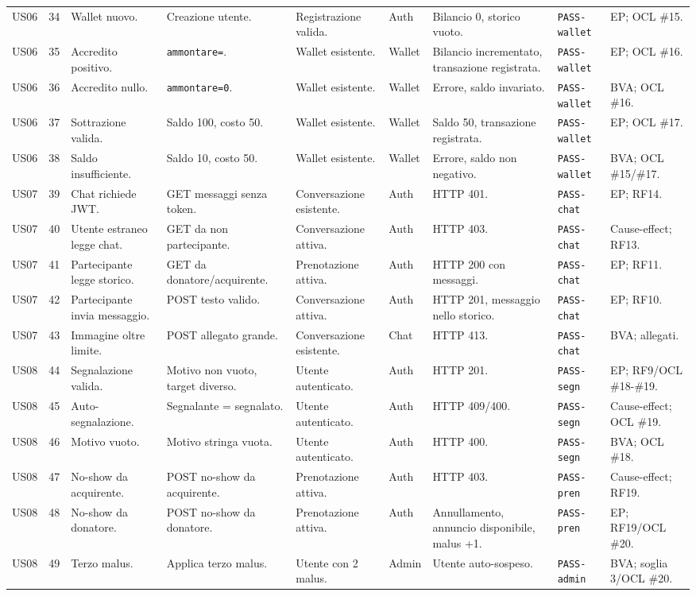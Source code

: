 \documentclass[11pt,a4paper]{article}
\newcommand{\code}[1]{\texttt{#1}}
\begin{document}
\begin{longtable}{L{1.2cm}C{0.45cm}L{2.35cm}L{2.05cm}L{1.95cm}L{0.9cm}L{2.3cm}L{1.55cm}L{2.05cm}}
US06 & 34 & Wallet nuovo. & Creazione utente. & Registrazione valida. & Auth & Bilancio 0, storico vuoto. & \code{PASS-wallet} & EP; OCL \#15. \\
US06 & 35 & Accredito positivo. & \code{ammontare=}. & Wallet esistente. & Wallet & Bilancio incrementato, transazione registrata. & \code{PASS-wallet} & EP; OCL \#16. \\
US06 & 36 & Accredito nullo. & \code{ammontare=0}. & Wallet esistente. & Wallet & Errore, saldo invariato. & \code{PASS-wallet} & BVA; OCL \#16. \\
US06 & 37 & Sottrazione valida. & Saldo 100, costo 50. & Wallet esistente. & Wallet & Saldo 50, transazione registrata. & \code{PASS-wallet} & EP; OCL \#17. \\
US06 & 38 & Saldo insufficiente. & Saldo 10, costo 50. & Wallet esistente. & Wallet & Errore, saldo non negativo. & \code{PASS-wallet} & BVA; OCL \#15/\#17. \\

US07 & 39 & Chat richiede JWT. & GET messaggi senza token. & Conversazione esistente. & Auth & HTTP 401. & \code{PASS-chat} & EP; RF14. \\
US07 & 40 & Utente estraneo legge chat. & GET da non partecipante. & Conversazione attiva. & Auth & HTTP 403. & \code{PASS-chat} & Cause-effect; RF13. \\
US07 & 41 & Partecipante legge storico. & GET da donatore/acquirente. & Prenotazione attiva. & Auth & HTTP 200 con messaggi. & \code{PASS-chat} & EP; RF11. \\
US07 & 42 & Partecipante invia messaggio. & POST testo valido. & Conversazione attiva. & Auth & HTTP 201, messaggio nello storico. & \code{PASS-chat} & EP; RF10. \\
US07 & 43 & Immagine oltre limite. & POST allegato grande. & Conversazione esistente. & Chat & HTTP 413. & \code{PASS-chat} & BVA; allegati. \\

US08 & 44 & Segnalazione valida. & Motivo non vuoto, target diverso. & Utente autenticato. & Auth & HTTP 201. & \code{PASS-segn} & EP; RF9/OCL \#18-\#19. \\
US08 & 45 & Auto-segnalazione. & Segnalante = segnalato. & Utente autenticato. & Auth & HTTP 409/400. & \code{PASS-segn} & Cause-effect; OCL \#19. \\
US08 & 46 & Motivo vuoto. & Motivo stringa vuota. & Utente autenticato. & Auth & HTTP 400. & \code{PASS-segn} & BVA; OCL \#18. \\
US08 & 47 & No-show da acquirente. & POST no-show da acquirente. & Prenotazione attiva. & Auth & HTTP 403. & \code{PASS-pren} & Cause-effect; RF19. \\
US08 & 48 & No-show da donatore. & POST no-show da donatore. & Prenotazione attiva. & Auth & Annullamento, annuncio disponibile, malus +1. & \code{PASS-pren} & EP; RF19/OCL \#20. \\
US08 & 49 & Terzo malus. & Applica terzo malus. & Utente con 2 malus. & Admin & Utente auto-sospeso. & \code{PASS-admin} & BVA; soglia 3/OCL \#20. \\


\end{longtable}
\end{document}

